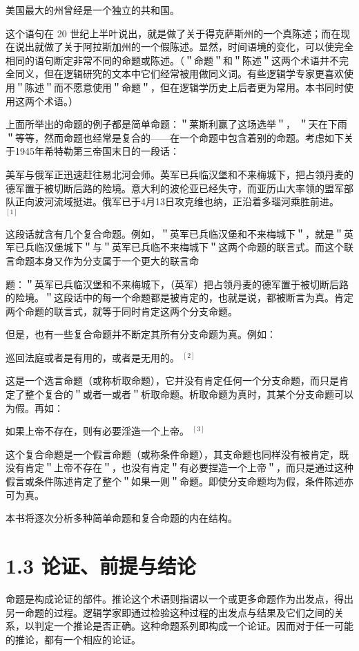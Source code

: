 美国最大的州曾经是一个独立的共和国。

这个语句在 20 世纪上半叶说出，就是做了关于得克萨斯州的一个真陈述；而在现在说出就做了关于阿拉斯加州的一个假陈述。显然，时间语境的变化，可以使完全相同的语句断定非常不同的命题或陈述。（＂命题＂和＂陈述＂这两个术语并不完全同义，但在逻辑研究的文本中它们经常被用做同义词。有些逻辑学专家更喜欢使用＂陈述＂而不愿意使用＂命题＂，但在逻辑学历史上后者更为常用。本书同时使用这两个术语。）

上面所举出的命题的例子都是简单命题：＂莱斯利赢了这场选举＂， ＂天在下雨＂等等，然而命题也经常是复合的——在一个命题中包含着别的命题。考虑如下关于1945年希特勒第三帝国末日的一段话：

美军与俄军正迅速赶往易北河会师。英军已兵临汉堡和不来梅城下，把占领丹麦的德军置于被切断后路的险境。意大利的波伦亚已经失守，而亚历山大率领的盟军部队正向波河流域挺进。俄军已于4月13日攻克维也纳，正沿着多瑙河乘胜前进。 ${ }^{[1]}$

这段话就含有几个复合命题。例如，＂英军已兵临汉堡和不来梅城下＂，就是＂英军已兵临汉堡城下＂与＂英军已兵临不来梅城下＂这两个命题的联言式。而这个联言命题本身又作为分支属于一个更大的联言命

题：＂英军已兵临汉堡和不来梅城下，（英军）把占领丹麦的德军置于被切断后路的险境。＂这段话中的每一个命题都是被肯定的，也就是说，都被断言为真。肯定两个命题的联言式，就等于同时肯定这两个分支命题。

但是，也有一些复合命题并不断定其所有分支命题为真。例如：

巡回法庭或者是有用的，或者是无用的。 ${ }^{[2]}$

这是一个选言命题（或称析取命题），它并没有肯定任何一个分支命题，而只是肯定了整个复合的＂或者一或者＂析取命题。析取命题为真时，其某个分支命题可以为假。再如：

如果上帝不存在，则有必要淫造一个上帝。 ${ }^{[3]}$

这个复合命题是一个假言命题（或称条件命题），其支命题也同样没有被肯定，既没有肯定＂上帝不存在＂，也没有肯定＂有必要捏造一个上帝＂，而只是通过这种假言或条件陈述肯定了整个＂如果一则＂命题。即使分支命题均为假，条件陈述亦可为真。

本书将逐次分析多种简单命题和复合命题的内在结构。

\section*{1.3 论证、前提与结论}
命题是构成论证的部件。推论这个术语则指谓以一个或更多命题作为出发点，得出另一命题的过程。逻辑学家即通过检验这种过程的出发点与结果及它们之间的关系，以判定一个推论是否正确。这种命题系列即构成一个论证。因而对于任一可能的推论，都有一个相应的论证。

